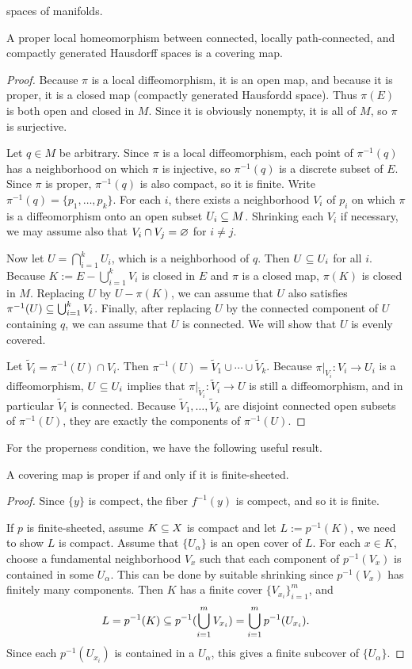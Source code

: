 spaces of manifolds.
\begin{proposition}
A proper local homeomorphism between connected, locally path-connected, and compactly generated Hausdorff spaces is a covering map.
\end{proposition}
\begin{proof}
Because $\pi$ is a local diffeomorphism, it is an open map, and because it is proper, it is a closed map (compactly generated Hausfordd space). Thus $\pi(E)$ is both 
open and closed in $M$. Since it is obviously nonempty, it is all of $M$, so $\pi$ is surjective.\par
Let $q\in M$ be arbitrary. Since $\pi$ is a local diffeomorphism, each point of $\pi^{-1}(q)$ has a neighborhood on which $\pi$ is injective, so $\pi^{-1}(q)$ is a 
discrete subset of $E$. Since $\pi$ is proper, $\pi^{-1}(q)$ is also compact, so it is finite. Write $\pi^{-1}(q)=\{p_1,\dots,p_k\}$. For each $i$, there exists a 
neighborhood $V_i$ of $p_i$ on which $\pi$ is a diffeomorphism onto an open subset $U_i\subseteq M$. Shrinking each $V_i$ if necessary, we may assume also that 
$V_i\cap V_j=\varnothing$ for $i\neq j$.\par
Now let $U=\bigcap_{i=1}^{k}U_i$, which is a neighborhood of $q$. Then $U\subseteq U_i$ for all $i$. Because $K:=E-\bigcup_{i=1}^{k}V_i$ is closed in $E$ and $\pi$ is a 
closed map, $\pi(K)$ is closed in $M$. Replacing $U$ by $U-\pi(K)$, we can assume that $U$ also satisfies $\pi^{-1}(U)\subseteq\bigcup_{i=1}^{k}V_i$. Finally, after replacing 
$U$ by the connected component of $U$ containing $q$, we can assume that $U$ is connected. We will show that $U$ is evenly covered.\par
Let $\widetilde{V}_i=\pi^{-1}(U)\cap V_i$. Then $\pi^{-1}(U)=\widetilde{V}_1\cup\cdots\cup\widetilde{V}_k$. Because $\pi|_{V_i}:V_i\to U_i$ is a diffeomorphism, 
$U\subseteq U_i$ implies that $\pi|_{\widetilde{V}_i}:\widetilde{V}_i\to U$ is still a diffeomorphism, and in particular $\widetilde{V}_i$ is connected. Because 
$\widetilde{V}_1,\dots,\widetilde{V}_k$ are disjoint connected open subsets of $\pi^{-1}(U)$, they are exactly the components of $\pi^{-1}(U)$.
\end{proof}
For the properness condition, we have the following useful result.
\begin{proposition}
A covering map is proper if and only if it is finite-sheeted.
\end{proposition}
\begin{proof}
Since $\{y\}$ is compect, the fiber $f^{-1}(y)$ is compect, and so it is finite.\par
If $p$ is finite-sheeted, assume $K\subseteq X$ is compact and let $L:=p^{-1}(K)$, we need to show $L$ is compact. Assume that $\{U_\alpha\}$ is an open cover of $L$. For 
each $x\in K$, choose a fundamental neighborhood $V_x$ such that each component of $p^{-1}(V_x)$ is contained in some $U_\alpha$. This can be done by suitable shrinking 
since $p^{-1}(V_x)$ has finitely many components. Then $K$ has a finite cover $\{V_{x_i}\}_{i=1}^{m}$, and
\[L=p^{-1}(K)\subseteq p^{-1}(\bigcup_{i=1}^{m}V_{x_i})=\bigcup_{i=1}^{m}p^{-1}(U_{x_i}).\]
Since each $p^{-1}(U_{x_i})$ is contained in a $U_\alpha$, this gives a finite subcover of $\{U_\alpha\}$.
\end{proof}
